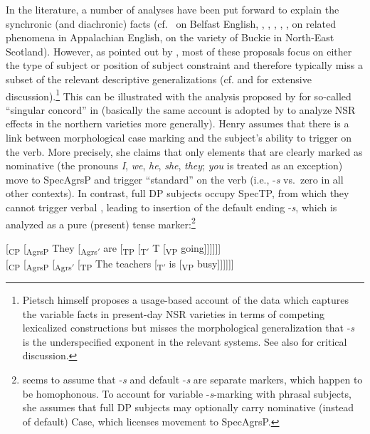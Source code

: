 \documentclass[output=paper]{langsci/langscibook}
\begin{document}
In the literature, a number of analyses have been put forward to explain the
synchronic (and diachronic) facts (cf.\ \citealt{Henry:1995} on Belfast
English, \citealt{Boerjarschapman:1998}, \citealt{Hudson:1999},
\citealt{Pietsch:2005a}, \citealt{deHaas2008,deHaas:2011},
\citealt{deHaasandvanKemenade:2015}, \citealt{TortoraDenDikken:2010} on related
phenomena in Appalachian English, \citealt{AdgerSmith2010} on the variety of
Buckie in North-East Scotland).  However, as pointed out by
\textcite[180]{Pietsch:2005a}, most of these proposals focus on either the type
of subject or position of subject constraint and therefore typically miss a
subset of the relevant descriptive generalizations (cf.
\citealt{Pietsch:2005a} and \citealt{deHaas:2011} for extensive
discussion).\footnote{Pietsch himself proposes a usage-based account of the
    data which captures the variable  facts in present-day \gls{NSR}
    varieties in terms of competing lexicalized constructions but misses the
morphological generalization that -\emph{s} is the underspecified exponent in
the relevant systems. See also \textcite[1122f.]{AdgerSmith2010} for critical
discussion.} This can be illustrated with the analysis proposed by
\textcite{Henry:1995} for so-called ``singular concord'' in 
(basically the same account is adopted by \citealt{deHaas2008} to analyze
\gls{NSR} effects in the northern varieties more generally). Henry assumes that
there is a link between morphological case marking and the subject's ability to
trigger  on the verb. More precisely, she claims that only elements
that are clearly marked as nominative (the pronouns \emph{I}, \emph{we},
\emph{he}, \emph{she}, \emph{they}; \emph{you} is treated as an exception) move
to SpecAgrsP and trigger ``standard''  on the verb (i.e., \Tsg{}
-\emph{s} vs.\ zero in all other contexts). In contrast, full DP subjects
occupy SpecTP, from which they cannot trigger verbal , leading to
insertion of the default ending -\emph{s}, which is analyzed as a pure
(present) tense marker:\footnote{\citeauthor{Henry:1995} seems to assume that
    \Tsg{} -\emph{s} and default -\emph{s} are separate markers, which happen
    to be homophonous.  To account for variable -\emph{s}-marking with phrasal
    subjects, she assumes that full DP subjects may optionally carry nominative
    (instead of default) Case, which licenses movement to SpecAgrsP.}

\ea
	\ea \mbox [\textsubscript{CP} [\textsubscript{AgrsP} They [\textsubscript{Agrs$'$} are [\textsubscript{TP} [\textsubscript{T$'$} T [\textsubscript{VP} going]]]]]]\\
	\ex \mbox [\textsubscript{CP} [\textsubscript{AgrsP} [\textsubscript{Agrs$'$} [\textsubscript{TP} The teachers [\textsubscript{T$'$} is [\textsubscript{VP} busy]]]]]]\\
    \z
\z
\end{document}
